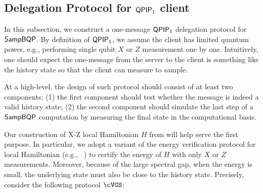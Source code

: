 
\subsection{Delegation Protocol for $\operatorname{\mathsf{QPIP}}_1$ client}
\label{sec:qpip1}
In this subsection, we construct a one-message $\operatorname{\mathsf{QPIP}}_1$ delegation protocol for $\operatorname{\mathsf{SampBQP}}$. By definition of $\operatorname{\mathsf{QPIP}}_1$, we assume the client has limited quantum power, e.g., performing single qubit $X$ or $Z$ measurement one by one.
Intuitively, one should expect the one-message from the server to the client is something like the history state so that the client can measure to sample.  

At a high-level, the design of such protocol should consist of at least two components: (1) the first component should test whether the message is indeed a valid history state; (2) the second component should simulate the last step of a $\operatorname{\mathsf{SampBQP}}$ computation by measuring the final state in the computational basis.

Our construction of X-Z local Hamiltonian $H$ from  will help serve the first purpose.
In particular, we adopt a variant of the energy verification protocol for local Hamiltonian (e.g., ~\cite{mf16, PhysRevA.93.022326}) to certify the energy of $H$ with only $X$ or $Z$ measurements.
Moreover, because of the large spectral gap, when the energy is small, the underlying state must also be close to the history state.
Precisely, consider the following protocol $\cVGS$:

